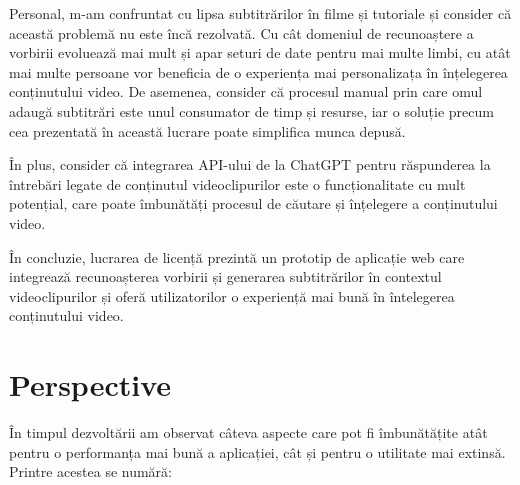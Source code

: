 \par
Personal, m-am confruntat cu lipsa subtitrărilor în filme și tutoriale și consider că această
problemă nu este încă rezolvată. Cu cât domeniul de recunoaștere a vorbirii evoluează mai mult
și apar seturi de date pentru mai multe limbi, cu atât mai multe persoane vor beneficia de o 
experiența mai personalizața în înțelegerea conținutului video. De asemenea, consider că procesul
manual prin care omul adaugă subtitrări este unul consumator de timp și resurse, iar o soluție
precum cea prezentată în această lucrare poate simplifica munca depusă.
\par
În plus, consider că integrarea API-ului de la ChatGPT pentru răspunderea la întrebări 
legate de conținutul videoclipurilor este o funcționalitate cu mult potențial, care poate
îmbunătăți procesul de căutare și înțelegere a conținutului video.
\par
În concluzie, lucrarea de licență prezintă un prototip de aplicație web care integrează
recunoașterea vorbirii și generarea subtitrărilor în contextul videoclipurilor și oferă
utilizatorilor o experiență mai bună în întelegerea conținutului video.

\section{Perspective}
\par
În timpul dezvoltării am observat câteva aspecte care pot fi îmbunătățite atât pentru o 
performanța mai bună a aplicației, cât și pentru o utilitate mai extinsă. Printre acestea
se numără:



